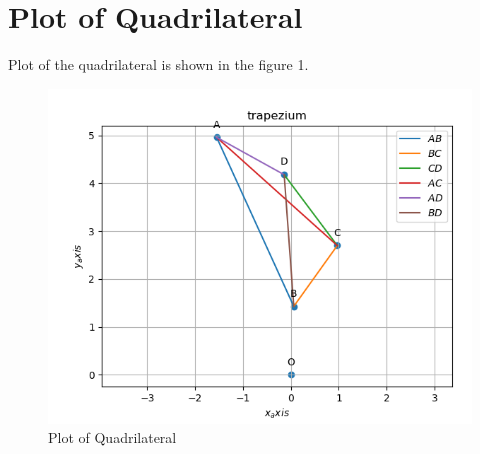 \documentclass[journal,10pt,twocolumn]{article}
\begin{document}
\section{Plot of Quadrilateral}
\vspace{0.25cm}
Plot of the quadrilateral is shown in the figure 1.
\begin{figure}[h]
\includegraphics[width=1\columnwidth]{line.png}
\caption{Plot of Quadrilateral}
\end{figure}
\end{document}
